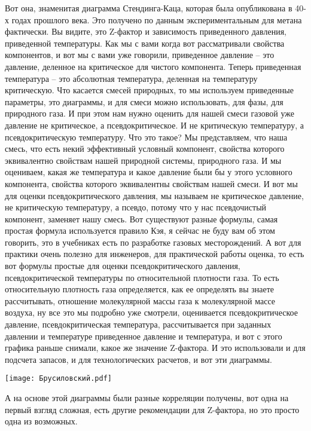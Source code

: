 \documentclass[main.tex]{subfiles}
\begin{document}
Вот она, знаменитая диаграмма Стендинга-Каца, которая была опубликована в 40-х годах прошлого века.
Это получено по данным экспериментальным для метана фактически.
Вы видите, это Z-фактор и зависимость приведенного давления, приведенной температуры.
Как мы с вами когда вот рассматривали свойства компонентов, и вот мы с вами уже говорили, приведенное давление -- это давление, деленное на критическое для чистого компонента.
Теперь приведенная температура -- это абсолютная температура, деленная на температуру критическую.
Что касается смесей природных, то мы используем приведенные параметры, это диаграммы, и для смеси можно использовать, для фазы, для природного газа.
И при этом нам нужно оценить для нашей смеси газовой уже давление не критическое, а псевдокритическое.
И не критическую температуру, а псевдокритическую температуру.
Что это такое?
Мы представляем, что наша смесь, что есть некий эффективный условный компонент, свойства которого эквивалентно свойствам нашей природной системы, природного газа.
И мы оцениваем, какая же температура и какое давление были бы у этого условного компонента, свойства которого эквивалентны свойствам нашей смеси.
И вот мы для оценки псевдокритического давления, мы называем не критическое давление, не критическую температуру, а псевдо, потому что у нас псевдочистый компонент, заменяет нашу смесь.
Вот существуют разные формулы, самая простая формула используется правило Кэя, я сейчас не буду вам об этом говорить, это в учебниках есть по разработке газовых месторождений.
А вот для практики очень полезно для инженеров, для практической работы оценка, то есть вот формулы простые для оценки псевдокритического давления, псевдокритической температуры по относительной плотности газа.
То есть относительную плотность газа определяется, как ее определять вы знаете рассчитывать, отношение молекулярной массы газа к молекулярной массе воздуха, ну все это мы подробно уже смотрели, оценивается псевдокритическое давление, псевдокритическая температура, рассчитывается при заданных давлении и температуре приведенное давление и температура, и вот с этого графика раньше снимали, какое же значение Z-фактора.
И это использовали и для подсчета запасов, и для технологических расчетов, и вот эти диаграммы.

\begin{center}
\texttt{[image: Брусиловский.pdf]}
\end{center}

А на основе этой диаграммы были разные корреляции получены, вот одна на первый взгляд сложная, есть другие рекомендации для Z-фактора, но это просто одна из возможных.
\end{document}
